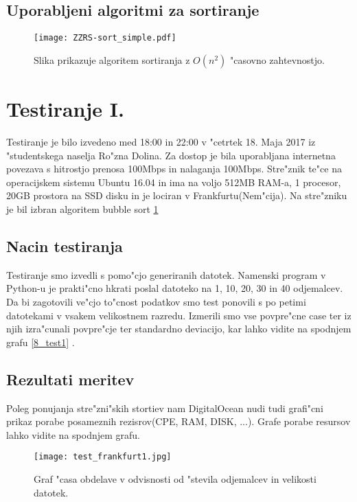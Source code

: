 \subsection{Uporabljeni algoritmi za sortiranje}
\begin{figure}
  \centering
    \texttt{[image: ZZRS-sort\_simple.pdf]}
  \caption{Slika prikazuje algoritem sortiranja z $O(n^2)$ "casovno zahtevnostjo.}
  \label{8_sort}  
\end{figure}

\section{Testiranje I. }
Testiranje je bilo izvedeno med 18:00 in 22:00 v "cetrtek 18. Maja 2017 iz "studentskega naselja Ro"zna Dolina. Za dostop je bila uporabljana internetna povezava s hitrostjo prenosa 100Mbps in nalaganja 100Mbps.
Stre"znik te"ce na operacijskem sistemu Ubuntu 16.04 in ima na voljo 512MB RAM-a, 1 procesor, 20GB prostora na SSD disku in je lociran v Frankfurtu(Nem"cija). Na stre"zniku je bil izbran algoritem bubble sort \ref{8_sort}

\subsection{Nacin testiranja}
Testiranje smo izvedli s pomo"cjo generiranih datotek. Namenski program v Python-u je prakti"cno hkrati poslal datoteko na 1, 10, 20, 30 in 40 odjemalcev. Da bi zagotovili ve"cjo to"cnost podatkov smo test ponovili s po petimi datotekami v vsakem velikostnem razredu. 
Izmerili smo vse povpre"cne case ter iz njih izra"cunali povpre"cje ter standardno deviacijo, kar lahko vidite na spodnjem grafu  \ref{8_test1} . 

\subsection{Rezultati meritev}
Poleg ponujanja stre"zni"skih stortiev nam DigitalOcean nudi tudi grafi"cni prikaz porabe posameznih rezisrov(CPE, RAM, DISK, ...).
Grafe porabe resursov lahko vidite na spodnjem grafu. 

\begin{figure}
  \centering
    \texttt{[image: test\_frankfurt1.jpg]}
  \caption{Graf "casa obdelave v odvisnosti od "stevila odjemalcev in velikosti datotek.}
  \label{8_graph_frankfurt1}
\end{figure}



